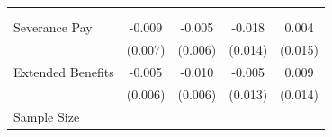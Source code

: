 {
\def\sym#1{\ifmmode^{#1}\else\(^{#1}\)\fi}
\begin{tabular}{l*{4}{c}}
\hline\hline
                    &&\\\cmidrule(lr){2-3}\cmidrule(lr){4-5}
                    &&&&\\
\hline
Severance Pay       &      -0.009         &      -0.005         &      -0.018         &       0.004         \\
                    &     (0.007)         &     (0.006)         &     (0.014)         &     (0.015)         \\
Extended Benefits   &      -0.005         &      -0.010         &      -0.005         &       0.009         \\
                    &     (0.006)         &     (0.006)         &     (0.013)         &     (0.014)         \\
\hline
Sample Size         &                     &                     &                     &                     \\
\hline\hline
\end{tabular}
}

